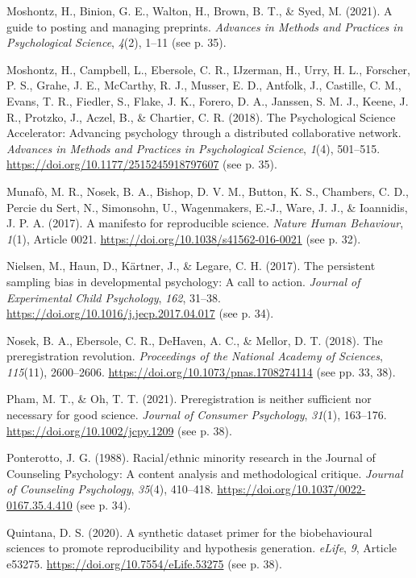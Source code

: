 \documentclass[authordate, empirical,issue]{jote-new-article}
\begin{document}
Moshontz, H., Binion, G. E., Walton, H., Brown, B. T., \& Syed, M. (2021). A guide to posting and managing preprints. \emph{Advances in Methods and Practices in Psychological Science}, \emph{4}(2), 1–11 (see p. 35).

Moshontz, H., Campbell, L., Ebersole, C. R., IJzerman, H., Urry, H. L., Forscher, P. S., Grahe, J. E., McCarthy, R. J., Musser, E. D., Antfolk, J., Castille, C. M., Evans, T. R., Fiedler, S., Flake, J. K., Forero, D. A., Janssen, S. M. J., Keene, J. R., Protzko, J., Aczel, B., \& Chartier, C. R. (2018). The Psychological Science Accelerator: Advancing psychology through a distributed collaborative network. \emph{Advances in Methods and Practices in Psychological Science}, \emph{1}(4), 501–515. \url{https://doi.org/10.1177/2515245918797607} (see p. 35).

Munafò, M. R., Nosek, B. A., Bishop, D. V. M., Button, K. S., Chambers, C. D., Percie du Sert, N., Simonsohn, U., Wagenmakers, E.-J., Ware, J. J., \& Ioannidis, J. P. A. (2017). A manifesto for reproducible science. \emph{Nature Human Behaviour}, \emph{1}(1), Article 0021. \url{https://doi.org/10.1038/s41562-016-0021} (see p. 32).

Nielsen, M., Haun, D., Kärtner, J., \& Legare, C. H. (2017). The persistent sampling bias in developmental psychology: A call to action. \emph{Journal of Experimental Child Psychology}, \emph{162}, 31–38. \url{https://doi.org/10.1016/j.jecp.2017.04.017} (see p. 34).

Nosek, B. A., Ebersole, C. R., DeHaven, A. C., \& Mellor, D. T. (2018). The preregistration revolution. \emph{Proceedings of the National Academy of Sciences}, \emph{115}(11), 2600–2606. \url{https://doi.org/10.1073/pnas.1708274114} (see pp. 33, 38).

Pham, M. T., \& Oh, T. T. (2021). Preregistration is neither sufficient nor necessary for good science. \emph{Journal of Consumer Psychology}, \emph{31}(1), 163–176. \url{https://doi.org/10.1002/jcpy.1209} (see p. 38).

Ponterotto, J. G. (1988). Racial/ethnic minority research in the Journal of Counseling Psychology: A content analysis and methodological critique. \emph{Journal of Counseling Psychology}, \emph{35}(4), 410–418. \url{https://doi.org/10.1037/0022-0167.35.4.410} (see p. 34).

Quintana, D. S. (2020). A synthetic dataset primer for the biobehavioural sciences to promote reproducibility and hypothesis generation. \emph{eLife}, \emph{9}, Article e53275. \url{https://doi.org/10.7554/eLife.53275} (see p. 38).
\end{document}
